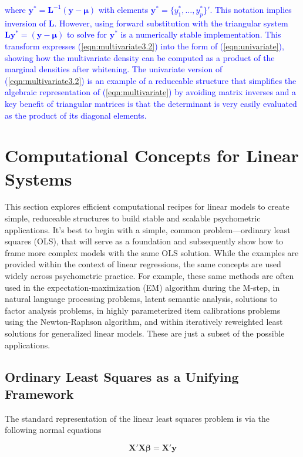 \documentclass[12pt]{article}
\begin{document}
\noindent \textcolor{blue}{where $\bm{y}^* = \bm{L}^{-1}(\bm{y}-\bm{\mu})$ with elements $\bm{y}^{*} = \{y_1^*, \ldots, y_p^*\}'$. This notation implies inversion of $\bm{L}$. However, using forward substitution with the triangular system $\bm{L}\bm{y}^* = (\bm{y}-\bm{\mu})$ to solve for $\bm{y}^*$ is a numerically stable implementation. This transform expresses (\ref{eqn:multivariate3.2}) into the form of (\ref{eqn:univariate}), showing how the multivariate density can be computed as a product of the marginal densities after whitening. The univariate version of (\ref{eqn:multivariate3.2}) is an example of a reduceable structure that simplifies the algebraic representation of (\ref{eqn:multivariate}) by avoiding matrix inverses and a key benefit of triangular matrices is that the determinant is very easily evaluated as the product of its diagonal elements.}

\section*{Computational Concepts for Linear Systems}

This section explores efficient computational recipes for linear models to create simple, reduceable structures to build stable and scalable psychometric applications. It's best to begin with a simple, common problem---ordinary least squares (OLS), that will serve as a foundation and subsequently show how to frame more complex models with the same OLS solution. While the examples are provided within the context of linear regressions, the same concepts are used widely across psychometric practice. For example, these same methods are often used in the expectation-maximization (EM) algorithm during the M-step, in natural language processing problems, latent semantic analysis, solutions to factor analysis problems, in highly parameterized item calibrations problems using the Newton-Raphson algorithm, and within iteratively reweighted least solutions for generalized linear models. These are just a subset of the possible applications.  

\subsection*{Ordinary Least Squares as a Unifying Framework}

The standard representation of the linear least squares problem is via the following normal equations \cite{mcandsearle:2001}   

\begin{equation}
\label{eqn:normal}
\bm{X'X\beta} = \bm{X'y}
\end{equation}
\end{document}
